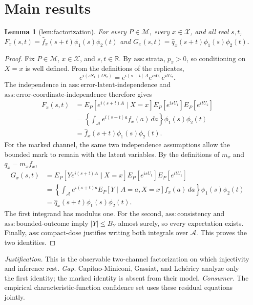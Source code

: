 \documentclass{article}
\newtheorem{lemma}{Lemma}
\begin{document}
\section{Main results}

\begin{lemma}[lem:factorization]\label{lem:factorization}
For every \(P\in\mathcal M\), every \(x\in\mathcal X\), and all real \(s,t\), \(F_x(s,t)=\widehat f_x(s+t)\phi_1(s)\phi_2(t)\) and \(G_x(s,t)=\widehat q_x(s+t)\phi_1(s)\phi_2(t)\).
\end{lemma}
\begin{proof}
Fix \(P\in\mathcal M\), \(x\in\mathcal X\), and \(s,t\in\mathbb R\).  By
\(\mathrm{ass{:}strata}\), \(p_x>0\), so conditioning on \(X=x\) is
well defined.  From the definitions of the replicates,
\[
 e^{i(sS_1+tS_2)}=e^{i(s+t)A}e^{isU_1}e^{itU_2}.
\]
The independence in \(\mathrm{ass{:}error\text{-}latent\text{-}independence}\)
and \(\mathrm{ass{:}error\text{-}coordinate\text{-}independence}\) therefore
gives
\[
\begin{aligned}
 F_x(s,t)
 &=E_P[e^{i(s+t)A}\mid X=x]E_P[e^{isU_1}]E_P[e^{itU_2}]\\
 &=\left\{\int_{\mathcal A}e^{i(s+t)a}f_x(a)\,da\right\}
      \phi_1(s)\phi_2(t)\\
 &=\widehat f_x(s+t)\phi_1(s)\phi_2(t).
\end{aligned}
\]
For the marked channel, the same two independence assumptions allow the
bounded mark to remain with the latent variables.  By the definitions of
\(m_x\) and \(q_x=m_xf_x\),
\[
\begin{aligned}
 G_x(s,t)
 &=E_P[Ye^{i(s+t)A}\mid X=x]E_P[e^{isU_1}]E_P[e^{itU_2}]\\
 &=\left\{\int_{\mathcal A}e^{i(s+t)a}
      E_P[Y\mid A=a,X=x]f_x(a)\,da\right\}\phi_1(s)\phi_2(t)\\
 &=\widehat q_x(s+t)\phi_1(s)\phi_2(t).
\end{aligned}
\]
The first integrand has modulus one.  For the second,
\(\mathrm{ass{:}consistency}\) and
\(\mathrm{ass{:}bounded\text{-}outcome}\) imply \(|Y|\le B_Y\) almost
surely, so every expectation exists.  Finally,
\(\mathrm{ass{:}compact\text{-}dose}\) justifies writing both integrals over
\(\mathcal A\).  This proves the two identities.
\end{proof}
\par\smallskip\noindent \textit{Justification.} This is the observable two-channel factorization on which injectivity and inference rest. \textit{Gap.} Capitao-Miniconi, Gassiat, and Lehéricy analyze only the first identity; the marked identity is absent from their model. \textit{Consumer.} The empirical characteristic-function confidence set uses these residual equations jointly.
\end{document}
